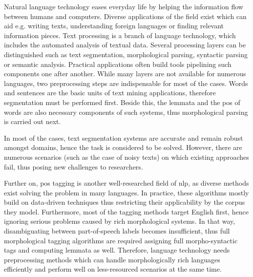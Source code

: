 
Natural language technology eases everyday life by helping the information flow between humans and computers.
Diverse applications of the field exist which can aid e.g. writing texts, understanding foreign languages or finding relevant information pieces.
Text processing is a branch of language technology, which includes the automated analysis of textual data. %
Several processing layers can be distinguished such as text segmentation, morphological parsing, syntactic parsing or semantic analysis.
Practical applications often build tools pipelining such components one after another. 
While many layers are not available for numerous languages, two preprocessing steps are indispensable for most of the cases.
Words and sentences are the basic units of text mining applications, therefore segmentation must be performed first.
Beside this, the lemmata and the \gls{pos} of words are also necessary components of such systems, thus morphological parsing is carried out next.

In most of the cases, text segmentation systems are accurate and remain robust amongst domains, hence the task is considered to be solved.
However, there are numerous scenarios (such as the case of noisy texts) on which existing approaches fail, thus posing new challenges to researchers.

Further on, \acrshort{pos} tagging is another well-researched field of \gls{nlp}, as diverse methods exist solving the problem in many languages. 
In practice, these algorithms mostly build on data-driven techniques thus restricting their applicability by the corpus they model.
Furthermore, most of the tagging methods target English first, hence ignoring serious problems caused by rich morphological systems.
In that way, disambiguating between part-of-speech labels becomes insufficient, thus full morphological tagging algorithms are required assigning full morpho-syntactic tags and computing lemmata as well.
Therefore, language technology needs preprocessing methods which can handle morphologically rich languages efficiently 
and perform well on less-resourced scenarios at the same time.

